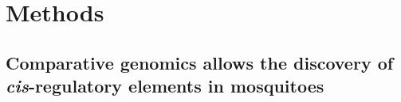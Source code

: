 
\appendix

\printglossaries


\chapter{Methods}

\section{Comparative genomics allows the discovery of \textit{cis}-regulatory elements in mosquitoes}

